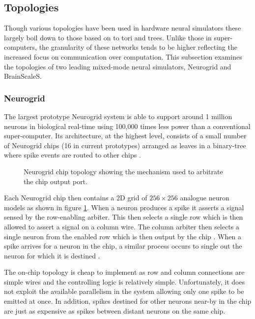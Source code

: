 		\subsection{Topologies}
			
			Though various topologies have been used in hardware neural simulators
			these largely boil down to those based on to tori and trees. Unlike those
			in super-computers, the granularity of these networks tends to be higher
			reflecting the increased focus on communication over computation.  This
			subsection examines the topologies of two leading mixed-mode neural
			simulators, Neurogrid and BrainScaleS.
			
			\subsubsection{Neurogrid}
				
				The largest prototype Neurogrid system is able to support around 1
				million neurons in biological real-time using 100,000 times less power
				than a conventional super-computer. Its architecture, at the highest
				level, consists of a small number of Neurogrid chips  (16 in current
				prototypes) arranged as leaves in a binary-tree where spike events are
				routed to other chips \cite{choudhary12}.
				
				\begin{figure}
					\center
					
					\caption[Neurogrid chip topology.]{Neurogrid chip topology showing the
					mechanism used to arbitrate the chip output port.}
					\label{fig:neurogrid-chip}
				\end{figure}
				
				Each Neurogrid chip then contains a 2D grid of $256\times256$ analogue
				neuron models as shown in figure \ref{fig:neurogrid-chip}. When a neuron
				produces a spike it asserts a signal sensed by the row-enabling arbiter.
				This then selects a single row which is then allowed to assert a signal
				on a column wire. The column arbiter then selects a single neuron from
				the enabled row which is then output by the chip \cite{boahen04}. When a
				spike arrives for a neuron in the chip, a similar process occurs to
				single out the neuron for which it is destined \cite{boahen04receiver}.
				
				The on-chip topology is cheap to implement as row and column connections
				are simple wires and the controlling logic is relatively simple.
				Unfortunately, it does not exploit the available parallelism in the
				system allowing only one spike to be emitted at once. In addition,
				spikes destined for other neurons near-by in the chip are just as
				expensive as spikes between distant neurons on the same chip.
				
